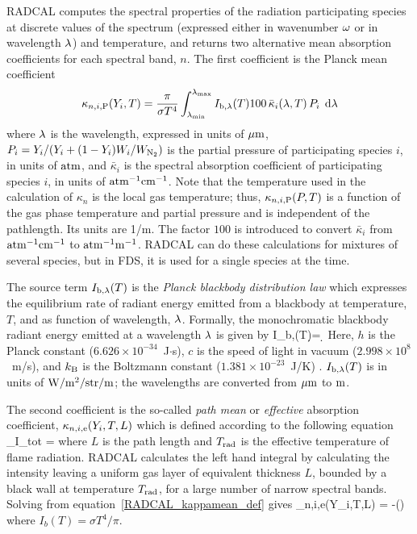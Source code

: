 RADCAL computes the spectral properties of the radiation participating species at discrete values of the spectrum (expressed either in wavenumber $\omega$ or in wavelength $\lambda$) and temperature,
and returns two alternative mean absorption coefficients for each spectral band, $n$. The first coefficient is the Planck mean coefficient \cite{Tien:1968}
\begin{equation}
\kappa_{n,i,{\rm P}}(Y_i,T) = \dfrac{\pi}{\sigma T^4}
\displaystyle\int_{\lambda_{\min}}^{\lambda_{\max}}{I_{\rm b,\lambda}(T)
100 \, \bar{\kappa}_i(\lambda,T) \, P_i \; \,\mathrm{d} \lambda}
\end{equation}
where $\lambda$ is the wavelength, expressed in units of ${\rm \mu m}$, $P_i=Y_i/(Y_i + (1-Y_i)W_i/W_{\rm N_2})$ is the partial pressure of participating species $i$, in units of ${\rm atm}$, and $\bar{\kappa}_i$ is the spectral absorption coefficient of participating species $i$, in units of ${\rm atm^{-1}cm^{-1}}$. Note that the temperature used in the calculation of $\kappa_n$ is the local gas temperature; thus, $\kappa_{n,i,{\rm P}}(P,T)$ is a function of the gas phase temperature and partial pressure and is independent of the pathlength. Its units are 1/m.
The factor $100$ is introduced to convert $\bar{\kappa}_i$ from ${\rm atm^{-1}cm^{-1}}$ to ${\rm atm^{-1}m^{-1}}$.
RADCAL can do these calculations for mixtures of several species, but in FDS, it is used for a single species at the time.

The source term $I_{\rm b,\lambda}(T)$ is the {\em Planck blackbody distribution law} which expresses the equilibrium rate of radiant energy emitted from a blackbody at temperature, $T$, and as function of wavelength, $\lambda$. Formally, the monochromatic blackbody radiant energy emitted at a wavelength $\lambda$ is given by \cite{Penner:1959}
\be \label{eq:Planck_law}
I_{\rm b,\la}(T)\d \la = \d \la
\ee
Here, $h$ is the Planck constant ($6.626 \times 10^{-34}$~J$\cdot$s), $c$ is the speed of light in vacuum ($2.998 \times 10^8$~m/s), and $k_{\rm B}$ is the Boltzmann constant ($1.381 \times 10^{-23}$~J/K) \cite{Mohr:2012}.
$I_{\rm b,\lambda}(T)$ is in units of $\rm{W/m^{2}/str/m}$; the wavelengths are converted from $\rm{\mu m}$ to $\rm{m}$.

The second coefficient is the so-called {\em path mean} or {\em effective} absorption coefficient, $\kappa_{n,i,{\rm e}}(Y_i,T,L)$ which is defined according to the following equation
\be
   _{I_{\rm tot}}
   = \frac{\sigma}{\pi}
    \label{RADCAL_kappamean_def}
\ee
where $L$ is the path length and $T_{\rm rad}$ is the effective temperature of flame radiation. RADCAL calculates the left hand integral by calculating the intensity leaving a uniform gas layer of equivalent thickness $L$, bounded by a black wall at temperature $T_{\rm rad}$, for a large number of narrow spectral bands. Solving from equation~\ref{RADCAL_kappamean_def} gives
\be
  \kappa_{n,i,{\rm e}}(Y_i,T,L) = -\ln\left(\right)
\ee
where $I_b(T) = \sigma T^4/\pi$.

